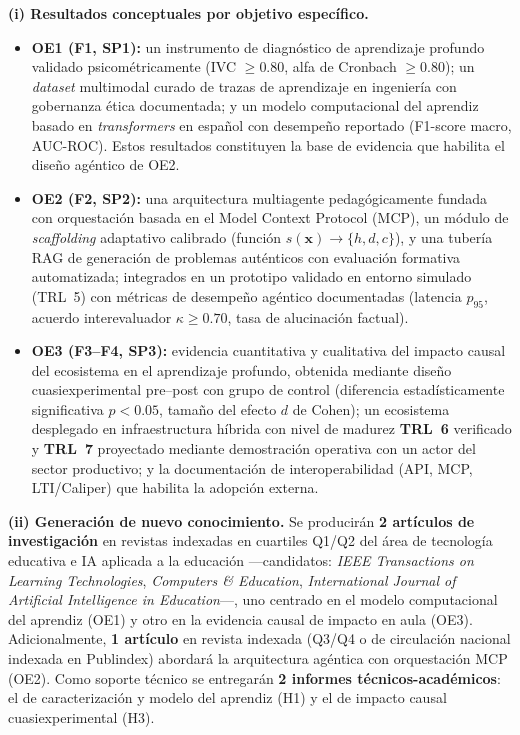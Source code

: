 \noindent\textbf{(i) Resultados conceptuales por objetivo específico.}
\begin{itemize}[leftmargin=*, itemsep=3pt]
    \item \textbf{OE1 (F1, SP1):} un instrumento de diagnóstico de aprendizaje
    profundo validado psicométricamente (IVC $\geq 0.80$, alfa de Cronbach $\geq
    0.80$); un \emph{dataset} multimodal curado de trazas de aprendizaje en
    ingeniería con gobernanza ética documentada; y un modelo computacional del
    aprendiz basado en \emph{transformers} en español con desempeño reportado
    (F1-score macro, AUC-ROC). Estos resultados constituyen la base de evidencia
    que habilita el diseño agéntico de OE2.
    \item \textbf{OE2 (F2, SP2):} una arquitectura multiagente pedagógicamente
    fundada con orquestación basada en el Model Context Protocol (MCP), un
    módulo de \emph{scaffolding} adaptativo calibrado (función
    $s(\mathbf{x})\to\{h,d,c\}$), y una tubería RAG de generación de problemas
    auténticos con evaluación formativa automatizada; integrados en un prototipo
    validado en entorno simulado (TRL~5) con métricas de desempeño agéntico
    documentadas (latencia $p_{95}$, acuerdo interevaluador $\kappa\geq 0.70$,
    tasa de alucinación factual).
    \item \textbf{OE3 (F3--F4, SP3):} evidencia cuantitativa y cualitativa del
    impacto causal del ecosistema en el aprendizaje profundo, obtenida mediante
    diseño cuasiexperimental pre--post con grupo de control (diferencia
    estadísticamente significativa $p<0.05$, tamaño del efecto $d$ de Cohen);
    un ecosistema desplegado en infraestructura híbrida con nivel de madurez
    \textbf{TRL~6} verificado y \textbf{TRL~7} proyectado mediante demostración
    operativa con un actor del sector productivo; y la documentación de
    interoperabilidad (API, MCP, LTI/Caliper) que habilita la adopción externa.
\end{itemize}

\medskip

\noindent\textbf{(ii) Generación de nuevo conocimiento.}
Se producirán \textbf{2 artículos de investigación} en revistas indexadas en
cuartiles Q1/Q2 del área de tecnología educativa e IA aplicada a la educación
—candidatos: \emph{IEEE Transactions on Learning Technologies},
\emph{Computers \& Education}, \emph{International Journal of Artificial
Intelligence in Education}—, uno centrado en el modelo computacional del
aprendiz (OE1) y otro en la evidencia causal de impacto en aula (OE3).
Adicionalmente, \textbf{1 artículo} en revista indexada (Q3/Q4 o de circulación
nacional indexada en Publindex) abordará la arquitectura agéntica con
orquestación MCP (OE2). Como soporte técnico se entregarán \textbf{2 informes
técnicos-académicos}: el de caracterización y modelo del aprendiz (H1) y el de
impacto causal cuasiexperimental (H3).

